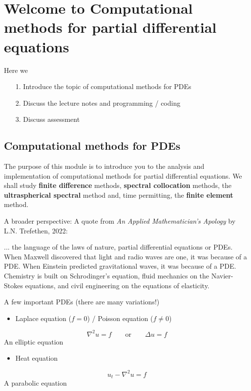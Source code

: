 \documentclass[12pt,landscape]{article}
\begin{document}
{\Huge
\sf
\section{Welcome to Computational methods for partial differential equations}
Here we

\begin{itemize}
\item[1. ] Introduce the topic of computational methods for PDEs


\item[2. ] Discuss the lecture notes and programming / coding


\item[3. ] Discuss assessment

\end{itemize}
\subsection{Computational methods for PDEs}
The purpose of this module is to introduce you to the analysis and implementation of computational methods for partial differential equations.  We shall study \textbf{finite difference} methods, \textbf{spectral collocation} methods, the \textbf{ultraspherical spectral} method and, time permitting, the \textbf{finite element} method.  

A broader perspective: A quote from \emph{An Applied Mathematician's Apology} by L.N. Trefethen, 2022:

... the language of the laws of nature, partial differential equations or PDEs. When Maxwell discovered that light and radio waves are one, it was because of a PDE. When Einstein predicted gravitational waves, it was because     of a PDE. Chemistry is built on Schrodinger's equation, fluid mechanics on the Navier-Stokes equations, and civil engineering on the equations of elasticity.

A few important PDEs (there are many variations!)

\begin{itemize}
\item Laplace equation ($f = 0$) / Poisson equation ($f \neq 0$) 

\end{itemize}
\[
\nabla^2 u = f   \qquad \text{or} \qquad \Delta u = f
\]
An elliptic equation

\begin{itemize}
\item Heat equation

\end{itemize}
\[
 u_t - \nabla^2 u = f 
\]
A parabolic equation

}
\end{document}
